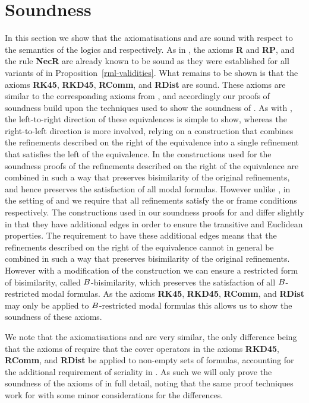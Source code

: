 \section{Soundness}\label{rml-kd45-soundness}

In this section we show that the axiomatisations \axiomRmlKFF{} and \axiomRmlKD{} are sound with respect to the semantics of the logics \logicRmlKFF{} and \logicRmlKD{} respectively.
As in \logicRmlK{}, the axioms {\bf R} and {\bf RP}, and the rule {\bf NecR} are already known to be sound as they were established for all variants of \logicRml{} in Proposition~\ref{rml-validities}.
What remains to be shown is that the axioms {\bf RK45}, {\bf RKD45}, {\bf RComm}, and {\bf RDist} are sound.
These axioms are similar to the corresponding axioms from \axiomRmlK{}, and accordingly our proofs of soundness build upon the techniques used to show the soundness of \axiomRmlK{}.
As with \axiomRmlK{}, the left-to-right direction of these equivalences is simple to show, whereas the right-to-left direction is more involved, relying on a construction that combines the refinements described on the right of the equivalence into a single refinement that satisfies the left of the equivalence.
In the constructions used for the soundness proofs of \axiomRmlK{} the refinements described on the right of the equivalence are combined in such a way that preserves bisimilarity of the original refinements, and hence preserves the satisfaction of all modal formulas.
However unlike \logicRmlK{}, in the setting of \logicRmlKFF{} and \logicRmlKD{} we require that all refinements satisfy the \classKFF{} or \classKD{} frame conditions respectively.
The constructions used in our soundness proofs for \axiomRmlKFF{} and \axiomRmlKD{} differ slightly in that they have additional edges in order to ensure the transitive and Euclidean properties.
The requirement to have these additional edges means that the refinements described on the right of the equivalence cannot in general be combined in such a way that preserves bisimilarity of the original refinements.
However with a modification of the construction we can ensure a restricted form of bisimilarity, called $B$-bisimilarity, which preserves the satisfaction of all $B$-restricted modal formulas.
As the axioms {\bf RK45}, {\bf RKD45}, {\bf RComm}, and {\bf RDist} may only be applied to $B$-restricted modal formulas this allows us to show the soundness of these axioms.

We note that the axiomatisations \axiomRmlKFF{} and \axiomRmlKD{} are very similar, the only difference being that the axioms of \axiomRmlKD{} require that the cover operators in the axioms {\bf RKD45}, {\bf RComm}, and {\bf RDist} be applied to non-empty sets of formulas, accounting for the additional requirement of seriality in \classKD{}.
As such we will only prove the soundness of the axioms of \axiomRmlKFF{} in full detail, noting that the same proof techniques work for \axiomRmlKD{} with some minor considerations for the differences.

